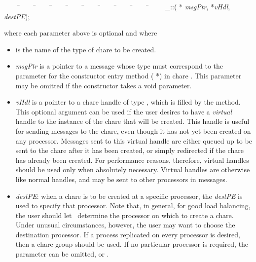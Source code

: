 \begin{tabbing}
~~~~ \=~~~~ \=~~~~ \=~~~~ \=~~~~ \=~~~~ \=~~~~ \=~~~~ \=~~~~ \=~~~~ \kill
\> \_::( *{\it
msgPtr},  *{\it vHdl},  {\it destPE});
\end{tabbing}

where each parameter above is optional and where

\begin{itemize}

\item {} is the name of the type of chare to be
created.

\item {\it msgPtr} is a pointer to a message whose type must
correspond to the parameter for the constructor entry method
( *) in chare .  This
parameter may be omitted if the constructor takes a void
parameter.

\item {\it vHdl} is a pointer to a chare handle of type
, which is filled by the  method. This optional
argument can be used if the user desires to have a {\em virtual} handle
 to the instance of the chare that will be
created. This handle is useful for sending messages to the
chare, even though it has not yet been created on any processor.
Messages sent to this virtual handle are either queued up to be sent to the
chare after it has been created, or simply redirected if the
chare has already been created. For performance reasons,
therefore, virtual handles should be used only when absolutely necessary.
Virtual handles are otherwise like normal handles, and may be
sent to other processors in messages.  

\item {\it destPE}: when a chare is to be created at a specific
processor, the {\it destPE} is used to specify that processor.  Note that, in
general, for good load balancing, the user should let
\charmpp\ determine the processor on which to create a chare.
Under unusual circumstances, however, the user may want to choose the
destination processor.  If a process replicated on every processor is desired,
then a chare group should be used.  If no particular
processor is required, the parameter can be omitted, or .

\end{itemize}

